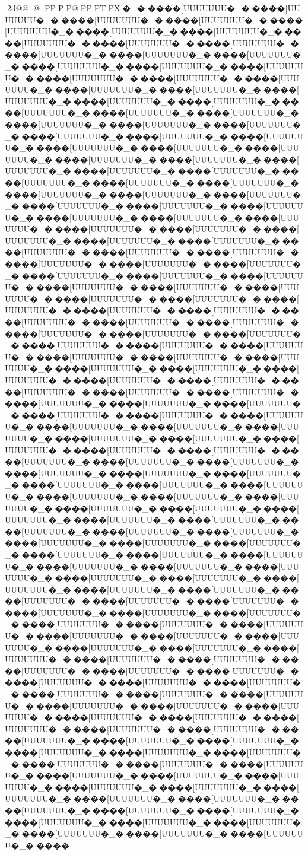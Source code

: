    2d  @ @  @          P   P  P  P@ PP PT PX                         �_�����[UUUUUUU�_�����[UUUUUUU�_�����[UUUUUUU�_�����[UUUUUUU�_�����[UUUUUUU�_�����[UUUUUUU�_�����[UUUUUUU�_�����[UUUUUUU�_�����[UUUUUUU�_�����[UUUUUUU�_�����[UUUUUUU�_�����[UUUUUUU�_�����[UUUUUUU�_�����[UUUUUUU�_�����[UUUUUUU�_�����[UUUUUUU�_�����[UUUUUUU�_�����[UUUUUUU�_�����[UUUUUUU�_�����[UUUUUUU�_�����[UUUUUUU�_�����[UUUUUUU�_�����[UUUUUUU�_�����[UUUUUUU�_�����[UUUUUUU�_�����[UUUUUUU�_�����[UUUUUUU�_�����[UUUUUUU�_�����[UUUUUUU�_�����[UUUUUUU�_�����[UUUUUUU�_�����[UUUUUUU�_�����[UUUUUUU�_�����[UUUUUUU�_�����[UUUUUUU�_�����[UUUUUUU�_�����[UUUUUUU�_�����[UUUUUUU�_�����[UUUUUUU�_�����[UUUUUUU�_�����[UUUUUUU�_�����[UUUUUUU�_�����[UUUUUUU�_�����[UUUUUUU�_�����[UUUUUUU�_�����[UUUUUUU�_�����[UUUUUUU�_�����[UUUUUUU�_�����[UUUUUUU�_�����[UUUUUUU�_�����[UUUUUUU�_�����[UUUUUUU�_�����[UUUUUUU�_�����[UUUUUUU�_�����[UUUUUUU�_�����[UUUUUUU�_�����[UUUUUUU�_�����[UUUUUUU�_�����[UUUUUUU�_�����[UUUUUUU�_�����[UUUUUUU�_�����[UUUUUUU�_�����[UUUUUUU�_�����[UUUUUUU�_�����[UUUUUUU�_�����[UUUUUUU�_�����[UUUUUUU�_�����[UUUUUUU�_�����[UUUUUUU�_�����[UUUUUUU�_�����[UUUUUUU�_�����[UUUUUUU�_�����[UUUUUUU�_�����[UUUUUUU�_�����[UUUUUUU�_�����[UUUUUUU�_�����[UUUUUUU�_�����[UUUUUUU�_�����[UUUUUUU�_�����[UUUUUUU�_�����[UUUUUUU�_�����[UUUUUUU�_�����[UUUUUUU�_�����[UUUUUUU�_�����[UUUUUUU�_�����[UUUUUUU�_�����[UUUUUUU�_�����[UUUUUUU�_�����[UUUUUUU�_�����[UUUUUUU�_�����[UUUUUUU�_�����[UUUUUUU�_�����[UUUUUUU�_�����[UUUUUUU�_�����[UUUUUUU�_�����[UUUUUUU�_�����[UUUUUUU�_�����[UUUUUUU�_�����[UUUUUUU�_�����[UUUUUUU�_�����[UUUUUUU�_�����[UUUUUUU�_�����[UUUUUUU�_�����[UUUUUUU�_�����[UUUUUUU�_�����[UUUUUUU�_�����[UUUUUUU�_�����[UUUUUUU�_�����[UUUUUUU�_�����[UUUUUUU�_�����[UUUUUUU�_�����[UUUUUUU�_�����[UUUUUUU�_�����[UUUUUUU�_�����[UUUUUUU�_�����[UUUUUUU�_�����[UUUUUUU�_�����[UUUUUUU�_�����[UUUUUUU�_�����[UUUUUUU�_�����[UUUUUUU�_�����[UUUUUUU�_�����[UUUUUUU�_�����[UUUUUUU�_�����[UUUUUUU�_�����[UUUUUUU�_�����[UUUUUUU�_�����[UUUUUUU�_�����[UUUUUUU�_�����[UUUUUUU�_�����[UUUUUUU�_�����[UUUUUUU�_�����[UUUUUUU�_�����[UUUUUUU�_�����[UUUUUUU�_�����[UUUUUUU�_�����[UUUUUUU�_�����[UUUUUUU�_�����[UUUUUUU�_�����[UUUUUUU�_�����[UUUUUUU�_�����[UUUUUUU�_�����[UUUUUUU�_�����[UUUUUUU�_�����[UUUUUUU�_�����[UUUUUUU�_�����[UUUUUUU�_�����[UUUUUUU�_�����[UUUUUUU�_�����[UUUUUUU�_�����[UUUUUUU�_�����[UUUUUUU�_�����[UUUUUUU�_�����[UUUUUUU�_�����[UUUUUUU�_�����[UUUUUUU�_�����[UUUUUUU�_�����[UUUUUUU�_�����[UUUUUUU�_�����[UUUUUUU�_�����[UUUUUUU�_�����[UUUUUUU�_�����[UUUUUUU�_�����[UUUUUUU�_�����[UUUUUUU�_�����[UUUUUUU�_�����[UUUUUUU�_�����[UUUUUUU�_�����[UUUUUUU�_�����[UUUUUUU�_�����[UUUUUUU�_�����[UUUUUUU�_�����[UUUUUUU�_�����[UUUUUUU�_�����[UUUUUUU�_�����[UUUUUUU�_�����[UUUUUUU�_�����[UUUUUUU�_�����[UUUUUUU�_�����[UUUUUUU�_�����[UUUUUUU�_�����[UUUUUUU�_�����[UUUUUUU�_�����[UUUUUUU�_�����[UUUUUUU�_�����[UUUUUUU�_�����[UUUUUUU�_�����[UUUUUUU�_�����[UUUUUUU�_�����[UUUUUUU�_�����[UUUUUUU�_�����[UUUUUUU�_�����[UUUUUUU�_�����[UUUUUUU�_�����[UUUUUUU�_�����[UUUUUUU�_�����[UUUUUUU�_�����[UUUUUUU�_�����[UUUUUUU�_�����[UUUUUUU�_�����[UUUUUUU�_�����[UUUUUUU�_�����[UUUUUUU�_�����